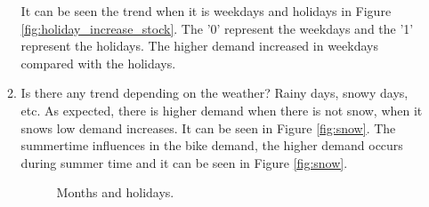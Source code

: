 \documentclass{article}
\begin{document}
\begin{enumerate}
\begin{enumerate}

It can be seen the trend when it is weekdays and holidays in Figure \ref{fig:holiday_increase_stock}. The '0' represent the weekdays and the '1' represent the holidays. The higher demand increased in weekdays compared with the holidays.


\item Is there any trend depending on the weather? Rainy days, snowy days, etc.
As expected, there is higher demand when there is not snow, when it snows low demand increases. It can be seen in Figure \ref{fig:snow}. The summertime influences in the bike demand, the higher demand occurs during summer time and it can be seen in Figure \ref{fig:snow}.

\begin{figure}[htb!]
\caption{Months and holidays.}
\label{fig:H}
\hfill
\end{figure}



\end{enumerate}

\end{enumerate}
\end{document}

